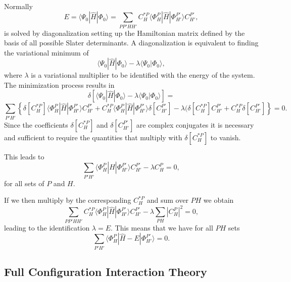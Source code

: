 \documentclass[%
twoside,                 %
final,                   %
10pt]{article}
\begin{document}
\paragraph{}
Normally 
\[
E= \langle \Psi_0 | \hat{H} |\Phi_0 \rangle= \sum_{PP'HH'}C_H^{*P}\langle \Phi_H^P | \hat{H} |\Phi_{H'}^{P'} \rangle C_{H'}^{P'},
\]
is solved by diagonalization setting up the Hamiltonian matrix defined by the basis of all possible Slater determinants. A diagonalization
is equivalent to finding the variational minimum   of 
\[
 \langle \Psi_0 | \hat{H} |\Phi_0 \rangle-\lambda \langle \Psi_0 |\Phi_0 \rangle,
\]
where $\lambda$ is a variational multiplier to be identified with the energy of the system.
The minimization process results in 
\[
\delta\left[ \langle \Psi_0 | \hat{H} |\Phi_0 \rangle-\lambda \langle \Psi_0 |\Phi_0 \rangle\right]=
\]
\[
\sum_{P'H'}\left\{\delta[C_H^{*P}]\langle \Phi_H^P | \hat{H} |\Phi_{H'}^{P'} \rangle C_{H'}^{P'}+
C_H^{*P}\langle \Phi_H^P | \hat{H} |\Phi_{H'}^{P'} \rangle \delta[C_{H'}^{P'}]-
\lambda( \delta[C_H^{*P}]C_{H'}^{P'}+C_H^{*P}\delta[C_{H'}^{P'}]\right\} = 0.
\]
Since the coefficients $\delta[C_H^{*P}]$ and $\delta[C_{H'}^{P'}]$ are complex conjugates it is necessary and sufficient to require the quantities that multiply with $\delta[C_H^{*P}]$ to vanish.  

This leads to 
\[
\sum_{P'H'}\langle \Phi_H^P | \hat{H} |\Phi_{H'}^{P'} \rangle C_{H'}^{P'}-\lambda C_H^{P}=0,
\]
for all sets of $P$ and $H$.

If we then multiply by the corresponding $C_H^{*P}$ and sum over $PH$ we obtain
\[ 
\sum_{PP'HH'}C_H^{*P}\langle \Phi_H^P | \hat{H} |\Phi_{H'}^{P'} \rangle C_{H'}^{P'}-\lambda\sum_{PH}|C_H^P|^2=0,
\]
leading to the identification $\lambda = E$. This means that we have for all $PH$ sets
\begin{equation}
\sum_{P'H'}\langle \Phi_H^P | \hat{H} -E|\Phi_{H'}^{P'} \rangle = 0. \label{eq:fullci}
\end{equation}



\subsection{Full Configuration Interaction Theory}

\end{document}
